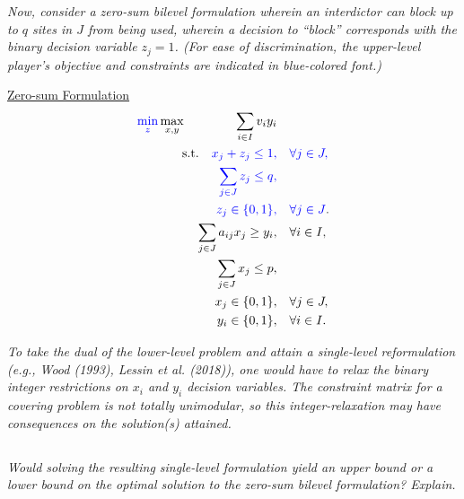 \documentclass[12pt]{amsart}
\begin{document}
\begin{center}
\begin{minipage}{0.75\linewidth}
\textit{Now, consider a zero-sum bilevel formulation wherein an interdictor can block up to $q$ sites
	in $J$ from being used, wherein a decision to “block” corresponds with the binary decision
	variable $z_j = 1$. (For ease of discrimination, the upper-level player’s objective and
	constraints are indicated in {\color{blue} blue-colored font}.)}
	
\end{minipage}
\end{center}

\begin{center}
\begin{minipage}{0.75\linewidth}
	
	\underline{Zero-sum Formulation}
	\begin{align*}
		{\color{blue}\min_z}\max_{x,y} \qquad\qquad \sum_{i\in I} v_iy_i& \\
		\text{s.t.}\quad
		{\color{blue} x_j+z_j \leq 1,}& \quad {\color{blue}\forall j\in J,}\\
		{\color{blue} \sum_{j\in J}z_j\leq q,}&  \\
		{\color{blue} z_j\in \{0,1\},}& {\color{blue}\quad\forall j\in J}.  \\
		\sum_{j\in J} a_{ij}x_j \geq y_i,& \quad \forall i\in I, \\
		\sum_{j\in J} x_j \leq p,& \\
		x_j \in \{0,1\},& \quad \forall j\in J, \\
		y_i \in \{0,1\},& \quad \forall i\in I.
	\end{align*}
	
\textit{To take the dual of the lower-level problem and attain a single-level reformulation (e.g.,
	Wood (1993), Lessin et al. (2018)), one would have to relax the binary integer restrictions
	on $x_i$ and $y_i$ decision variables. The constraint matrix for a covering problem is not totally
	unimodular, so this integer-relaxation may have consequences on the solution(s) attained.}

\end{minipage}
\end{center}		

\subsection{}
\textit{Would solving the resulting single-level formulation yield an upper bound or a lower bound
on the optimal solution to the zero-sum bilevel formulation? Explain.}
\end{document}
